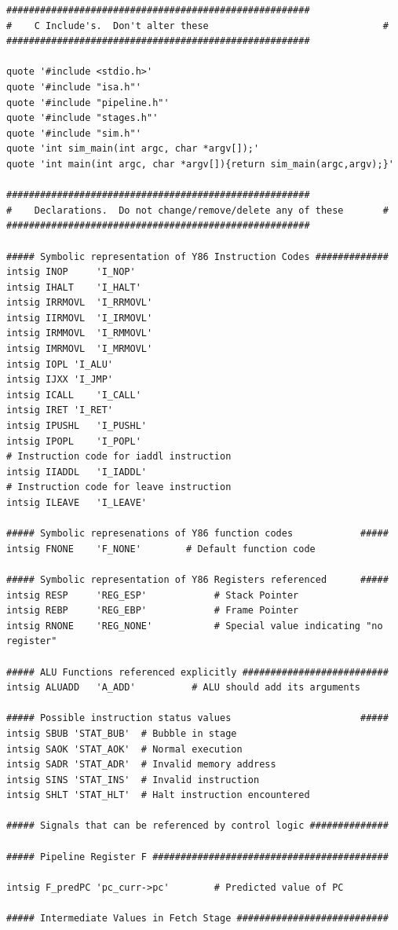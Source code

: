 \documentclass{article}
\begin{document}
\begin{itemize}
\begin{lstlisting}[caption={}]
######################################################
#    C Include's.  Don't alter these                               #
######################################################

quote '#include <stdio.h>'
quote '#include "isa.h"'
quote '#include "pipeline.h"'
quote '#include "stages.h"'
quote '#include "sim.h"'
quote 'int sim_main(int argc, char *argv[]);'
quote 'int main(int argc, char *argv[]){return sim_main(argc,argv);}'

######################################################
#    Declarations.  Do not change/remove/delete any of these       #
######################################################

##### Symbolic representation of Y86 Instruction Codes #############
intsig INOP 	'I_NOP'
intsig IHALT	'I_HALT'
intsig IRRMOVL	'I_RRMOVL'
intsig IIRMOVL	'I_IRMOVL'
intsig IRMMOVL	'I_RMMOVL'
intsig IMRMOVL	'I_MRMOVL'
intsig IOPL	'I_ALU'
intsig IJXX	'I_JMP'
intsig ICALL	'I_CALL'
intsig IRET	'I_RET'
intsig IPUSHL	'I_PUSHL'
intsig IPOPL	'I_POPL'
# Instruction code for iaddl instruction
intsig IIADDL	'I_IADDL'
# Instruction code for leave instruction
intsig ILEAVE	'I_LEAVE'

##### Symbolic represenations of Y86 function codes            #####
intsig FNONE    'F_NONE'        # Default function code

##### Symbolic representation of Y86 Registers referenced      #####
intsig RESP     'REG_ESP'    	     # Stack Pointer
intsig REBP     'REG_EBP'    	     # Frame Pointer
intsig RNONE    'REG_NONE'   	     # Special value indicating "no register"

##### ALU Functions referenced explicitly ##########################
intsig ALUADD	'A_ADD'		     # ALU should add its arguments

##### Possible instruction status values                       #####
intsig SBUB	'STAT_BUB'	# Bubble in stage
intsig SAOK	'STAT_AOK'	# Normal execution
intsig SADR	'STAT_ADR'	# Invalid memory address
intsig SINS	'STAT_INS'	# Invalid instruction
intsig SHLT	'STAT_HLT'	# Halt instruction encountered

##### Signals that can be referenced by control logic ##############

##### Pipeline Register F ##########################################

intsig F_predPC 'pc_curr->pc'	     # Predicted value of PC

##### Intermediate Values in Fetch Stage ###########################


\end{lstlisting}
\end{itemize}
\end{document}
